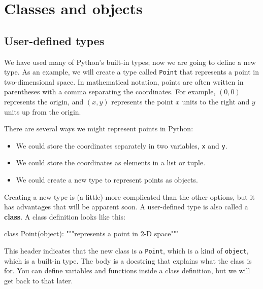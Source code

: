 \chapter{Classes and objects}


\section{User-defined types}
\label{point}


We have used many of Python's built-in types; now we are going
to define a new type.  As an example, we will create a type
called {\tt Point} that represents a point in two-dimensional
space.
%
%
In mathematical notation, points are often written in
parentheses with a comma separating the coordinates. For example,
$(0, 0)$ represents the origin, and $(x, y)$ represents the
point $x$ units to the right and $y$ units up from the origin.

There are several ways we might represent points in Python:

\begin{itemize}

\item We could store the coordinates separately in two
variables, {\tt x} and {\tt y}.

\item We could store the coordinates as elements in a list
or tuple.

\item We could create a new type to represent points as
objects.

\end{itemize}


Creating a new type
is (a little) more complicated than the other options, but
it has advantages that will be apparent soon.
%
A user-defined type is also called a {\bf class}.
A class definition looks like this:


\beforeverb
\begin{pycode}
class Point(object):
    """represents a point in 2-D space"""
\end{pycode}
\afterverb
%
This header indicates that the new class is a {\tt Point},
which is a kind of {\tt object}, which is a built-in
type.
%
%
The body is a docstring that explains what the class is for.
You can define variables and functions inside a class definition,
but we will get back to that later.

